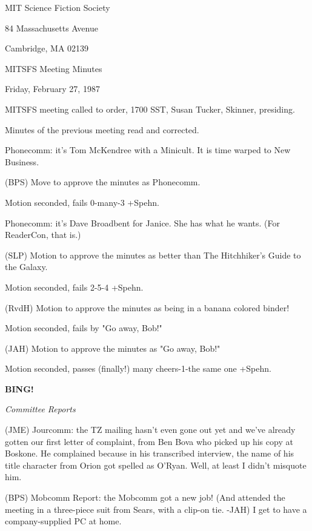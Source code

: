 \documentclass[12pt]{article}
\newcommand{\bing}{{\bf BING!} }
\newcommand{\goto}[1]{\bing \vskip 12pt \centerline{{\em{#1}}}}
\begin{document}
\begin{center}

MIT Science Fiction Society 

84 Massachusetts Avenue

Cambridge, MA 02139

\vspace{12pt}

MITSFS Meeting Minutes 

Friday, February 27, 1987

\end{center}
 
\vspace{18pt}

\setlength{\parskip}{6pt}

\noindent
MITSFS meeting called to order, 1700 SST,
Susan Tucker, Skinner, presiding.

Minutes of the previous meeting read and corrected.

Phonecomm: it's Tom McKendree with a Minicult. It is time warped to New Business.

(BPS) Move to approve the minutes as Phonecomm.

Motion seconded, fails 0-many-3 +Spehn.

Phonecomm: it's Dave Broadbent for Janice. She has what he wants. (For ReaderCon, that is.)

(SLP) Motion to approve the minutes as better than The Hitchhiker's Guide to the Galaxy.

Motion seconded, fails 2-5-4 +Spehn.

(RvdH) Motion to approve the minutes as being in a banana colored binder!

Motion seconded, fails by "Go away, Bob!"

(JAH) Motion to approve the minutes as "Go away, Bob!"

Motion seconded, passes (finally!) many cheers-1-the same one +Spehn.

\goto{Committee Reports}

(JME) Jourcomm: the TZ mailing hasn't even gone out yet and we've already gotten our first letter of complaint, from Ben Bova who picked up his copy at Boskone. He complained because in his transcribed interview, the name of his title character from Orion got spelled as O'Ryan. Well, at least I didn't misquote him.

(BPS) Mobcomm Report: the Mobcomm got a new job! (And attended the meeting in a three-piece suit from Sears, with a clip-on tie. -JAH) I get to have a company-supplied PC at home.
\end{document}
